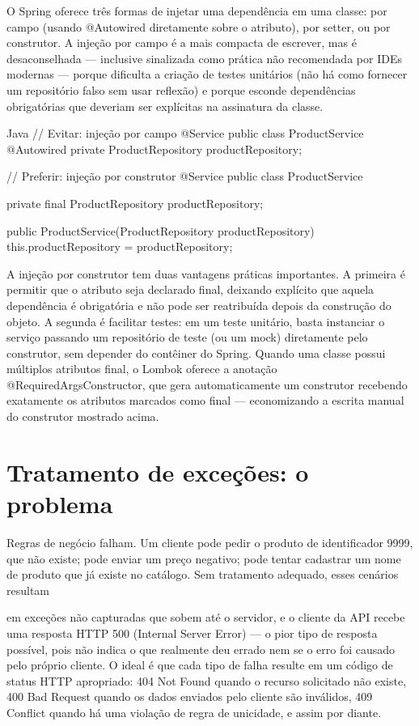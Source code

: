 O Spring oferece três formas de injetar uma dependência em uma classe: por campo (usando @Autowired diretamente sobre o atributo), por setter, ou por construtor. A injeção por campo é a mais compacta de escrever, mas é desaconselhada — inclusive sinalizada como prática não recomendada por IDEs modernas — porque dificulta a criação de testes unitários (não há como fornecer um repositório falso sem usar reflexão) e porque esconde dependências obrigatórias que deveriam ser explícitas na assinatura da classe.

\begin{codebox}{Java}
 // Evitar: injeção por campo
 @Service
 public class ProductService {
     @Autowired
     private ProductRepository productRepository;
 }

 // Preferir: injeção por construtor
 @Service
 public class ProductService {
     private final ProductRepository productRepository;

        public ProductService(ProductRepository productRepository) {
            this.productRepository = productRepository;
        }
 }
\end{codebox}

A injeção por construtor tem duas vantagens práticas importantes. A primeira é permitir que o atributo seja declarado final, deixando explícito que aquela dependência é obrigatória e não pode ser reatribuída depois da construção do objeto. A segunda é facilitar testes: em um teste unitário, basta instanciar o serviço passando um repositório de teste (ou um mock) diretamente pelo construtor, sem depender do contêiner do Spring. Quando uma classe possui múltiplos atributos final, o Lombok oferece a anotação @RequiredArgsConstructor, que gera automaticamente um construtor recebendo exatamente os atributos marcados como final — economizando a escrita manual do construtor mostrado acima.

\section{Tratamento de exceções: o problema}

Regras de negócio falham. Um cliente pode pedir o produto de identificador 9999, que não existe; pode enviar um preço negativo; pode tentar cadastrar um nome de produto que já existe no catálogo. Sem tratamento adequado, esses cenários resultam

em exceções não capturadas que sobem até o servidor, e o cliente da API recebe uma resposta HTTP 500 (Internal Server Error) — o pior tipo de resposta possível, pois não indica o que realmente deu errado nem se o erro foi causado pelo próprio cliente. O ideal é que cada tipo de falha resulte em um código de status HTTP apropriado: 404 Not Found quando o recurso solicitado não existe, 400 Bad Request quando os dados enviados pelo cliente são inválidos, 409 Conflict quando há uma violação de regra de unicidade, e assim por diante.


